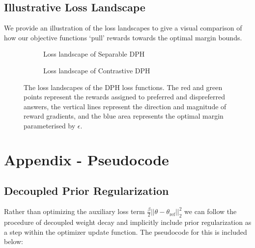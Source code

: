 \subsection{Illustrative Loss Landscape}
We provide an illustration of the loss landscapes to give a visual comparison of how our objective functions `pull' rewards towards the optimal margin bounds.
\begingroup
\begin{figure}[h]
    \centering
    \begin{subfigure}[b]{0.49\textwidth}
        \centering
        \caption{Loss landscape of Separable DPH}
        \label{fig:sep_dph_loss}
    \end{subfigure}
    \hfill
    \begin{subfigure}[b]{0.49\textwidth}
        \centering
        \caption{Loss landscape of Contrastive DPH}
        \label{fig:con_dph_loss}
    \end{subfigure}
    \caption{The loss landscapes of the DPH loss functions. The red and green points represent the rewards assigned to preferred and dispreferred answers, the vertical lines represent the direction and magnitude of reward gradients, and the blue area represents the optimal margin parameterised by $\epsilon$.}
    \label{fig:both_dph_loss}
\end{figure}
\endgroup

\newpage
\section{Appendix - Pseudocode}

\subsection{Decoupled Prior Regularization} \label{sec:decoupled-pr}

Rather than optimizing the auxiliary loss term $\tfrac{\beta}{2}||\theta-\theta_{\text{ref}}||^2_2$ we can follow the procedure of decoupled weight decay and implicitly include prior regularization as a step within the optimizer update function. The pseudocode for this is included below:

